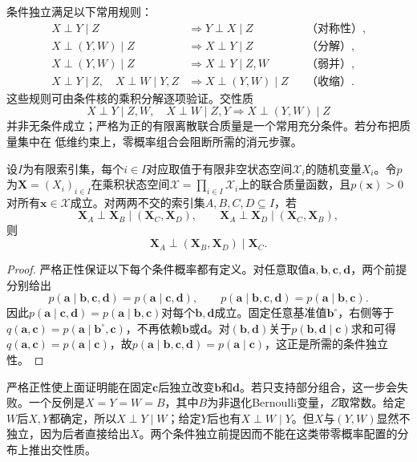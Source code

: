 条件独立满足以下常用规则：
\[
\begin{aligned}
  X\perp Y\mid Z
  &\Longrightarrow Y\perp X\mid Z
  &&\text{（对称性）},\\
  X\perp(Y,W)\mid Z
  &\Longrightarrow X\perp Y\mid Z
  &&\text{（分解）},\\
  X\perp(Y,W)\mid Z
  &\Longrightarrow X\perp Y\mid Z,W
  &&\text{（弱并）},\\
  X\perp Y\mid Z,\quad X\perp W\mid Y,Z
  &\Longrightarrow X\perp(Y,W)\mid Z
  &&\text{（收缩）}.
\end{aligned}
\]
这些规则可由条件核的乘积分解逐项验证。交性质
\[ X\perp Y\mid Z,W,\quad
  X\perp W\mid Z,Y\Longrightarrow X\perp(Y,W)\mid Z \]
并非无条件成立；严格为正的有限离散联合质量是一个常用充分条件。若分布把质量集中在
低维约束上，零概率组合会阻断所需的消元步骤。

\begin{lemma}[严格正离散分布的交性质]
  \label{lem:probability-positive-intersection}
  设$I$为有限索引集，每个$i\in I$对应取值于有限非空状态空间$\mathcal{X}_i$的随机变量$X_i$。令$p$为$\bm{X}=(X_i)_{i\in I}$在乘积状态空间$\mathcal{X}=\prod_{i\in I}\mathcal{X}_i$上的联合质量函数，且$p(\bm{x})>0$对所有$\bm{x}\in\mathcal{X}$成立。对两两不交的索引集$A,B,C,D\subseteq I$，若
  \[
    \bm{X}_A\perp\bm{X}_B\mid(\bm{X}_C,\bm{X}_D),
    \qquad
    \bm{X}_A\perp\bm{X}_D\mid(\bm{X}_C,\bm{X}_B),
  \]
  则
  \[
    \bm{X}_A\perp(\bm{X}_B,\bm{X}_D)\mid\bm{X}_C.
  \]
\end{lemma}

\begin{proof}
严格正性保证以下每个条件概率都有定义。对任意取值$\bm{a},\bm{b},\bm{c},\bm{d}$，两个前提分别给出
\[
  p(\bm{a}\mid\bm{b},\bm{c},\bm{d})
  =p(\bm{a}\mid\bm{c},\bm{d}),
  \qquad
  p(\bm{a}\mid\bm{b},\bm{c},\bm{d})
  =p(\bm{a}\mid\bm{b},\bm{c}).
\]
因此$p(\bm{a}\mid\bm{c},\bm{d})=p(\bm{a}\mid\bm{b},\bm{c})$对每个$\bm{b},\bm{d}$成立。固定任意基准值$\bm{b}^{\circ}$，右侧等于$q(\bm{a},\bm{c})=p(\bm{a}\mid\bm{b}^{\circ},\bm{c})$，不再依赖$\bm{b}$或$\bm{d}$。对$(\bm{b},\bm{d})$关于$p(\bm{b},\bm{d}\mid\bm{c})$求和可得$q(\bm{a},\bm{c})=p(\bm{a}\mid\bm{c})$，故$p(\bm{a}\mid\bm{b},\bm{c},\bm{d})=p(\bm{a}\mid\bm{c})$，这正是所需的条件独立性。
\end{proof}
严格正性使上面证明能在固定\(\bm c\)后独立改变\(\bm b\)和\(\bm d\)。若只支持部分组合，这一步会失败。一个反例是\(X=Y=W=B\)，其中\(B\)为非退化Bernoulli变量，\(Z\)取常数。给定\(W\)后\(X,Y\)都确定，所以\(X\perp Y\mid W\)；给定\(Y\)后也有\(X\perp W\mid Y\)。但\(X\)与\((Y,W)\)显然不独立，因为后者直接给出\(X\)。两个条件独立前提因而不能在这类带零概率配置的分布上推出交性质。

